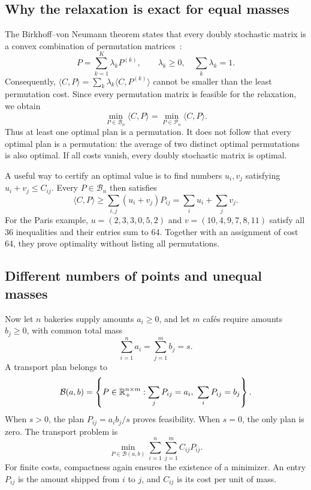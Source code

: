 \subsection{Why the relaxation is exact for equal masses}
The Birkhoff--von Neumann theorem states that every doubly stochastic matrix is a convex combination of permutation matrices~\cite{birkhoff,von1953certain}:
\[
 P=\sum_{k=1}^K\lambda_k P^{(k)},
 \qquad \lambda_k\ge0,\quad\sum_k\lambda_k=1.
\]
Consequently, $\langle C,P\rangle=\sum_k\lambda_k\langle C,P^{(k)}\rangle$ cannot be smaller than the least permutation cost. Since every permutation matrix is feasible for the relaxation, we obtain
\begin{equation}\label{eq:monge-vs-kanto}
 \min_{P\in\mathcal B_n}\langle C,P\rangle
 =\min_{P\in\mathcal P_n}\langle C,P\rangle.
\end{equation}
Thus at least one optimal plan is a permutation. It does not follow that every optimal plan is a permutation: the average of two distinct optimal permutations is also optimal. If all costs vanish, every doubly stochastic matrix is optimal.

A useful way to certify an optimal value is to find numbers $u_i,v_j$ satisfying $u_i+v_j\le C_{ij}$. Every $P\in\mathcal B_n$ then satisfies
\[
 \langle C,P\rangle\ge\sum_{i,j}(u_i+v_j)P_{ij}=\sum_i u_i+\sum_jv_j.
\]
For the Paris example, $u=(2,3,3,0,5,2)$ and $v=(10,4,9,7,8,11)$ satisfy all 36 inequalities and their entries sum to 64. Together with an assignment of cost 64, they prove optimality without listing all permutations.

\subsection{Different numbers of points and unequal masses}
Now let $n$ bakeries supply amounts $a_i\ge0$, and let $m$ cafés require amounts $b_j\ge0$, with common total mass
\[
 \sum_{i=1}^n a_i=\sum_{j=1}^m b_j=s.
\]
A transport plan belongs to
\[
 \mathcal B(a,b)=\left\{P\in\RR_+^{n\times m}:\sum_jP_{ij}=a_i,\ \sum_iP_{ij}=b_j\right\}.
\]
When $s>0$, the plan $P_{ij}=a_i b_j/s$ proves feasibility. When $s=0$, the only plan is zero. The transport problem is
\begin{equation}\label{eq-kanto-gen}
 \min_{P\in\mathcal B(a,b)}\sum_{i=1}^n\sum_{j=1}^m C_{ij}P_{ij}.
\end{equation}
For finite costs, compactness again ensures the existence of a minimizer. An entry $P_{ij}$ is the amount shipped from $i$ to $j$, and $C_{ij}$ is its cost per unit of mass.

